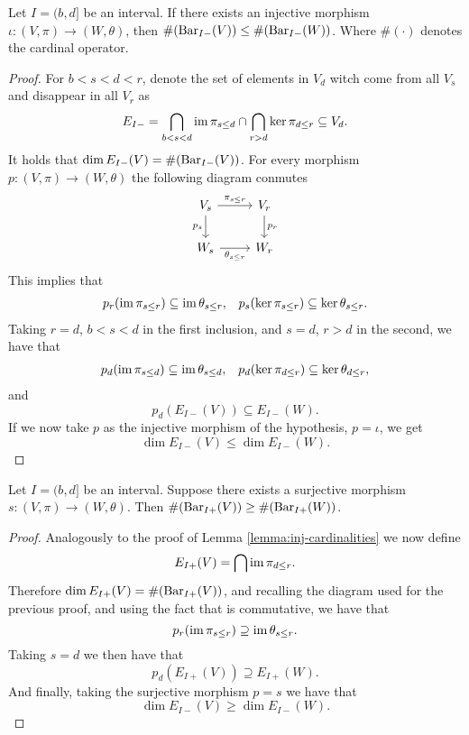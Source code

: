 \begin{lemma} \label{lemma:inj-cardinalities}
    Let $ I = (b, d] $ be an interval. If there exists an injective morphism $\iota \colon (V, \pi) \to (W, \theta) $, then $\#(\operatorname{Bar}_{I-}(V)) \leq \#(\operatorname{Bar}_{I-}(W)) $. Where $ \#(\cdot) $ denotes the cardinal operator.
\end{lemma}
\begin{proof}
    For $ b < s < d < r $, denote the set of elements in $ V_d $ witch come from all $ V_s $ and disappear in all $ V_r $ as
    $$
        E_{I-} = \bigcap_{b < s < d} \operatorname{im} \pi_{s\leq d} \cap \bigcap_{r> d} \ker \pi_{d \leq r} \subseteq V_d.
    $$
    It holds that $ \dim E_{I-}(V) = \#(\operatorname{Bar}_{I-}(V)) $. For every morphism $ p\colon (V, \pi) \to (W, \theta) $ the following diagram conmutes
    $$
    \begin{tikzcd}
        V_s \arrow[r, "\pi_{s \leq r}"] \arrow[d, "p_s"'] & V_r \arrow[d, "p_r"] \\
        W_s \arrow[r, "\theta_{s \leq r}"']               & W_r
    \end{tikzcd}
    $$
    This implies that
    \begin{align}
        p_r(\operatorname{im} \pi_{s \leq r}) \subseteq \operatorname{im} \theta_{s \leq r}, & & p_s(\ker \pi_{s \leq r}) \subseteq \ker \theta_{s \leq r}.
    \end{align}
    Taking $ r = d $, $ b < s < d $ in the first inclusion, and $ s = d $, $ r > d $ in the second, we have that
    \begin{align}
        p_d(\operatorname{im} \pi_{s \leq d}) \subseteq \operatorname{im} \theta_{s \leq d}, & & p_d(\ker \pi_{d \leq r}) \subseteq \ker \theta_{d \leq r},
    \end{align}
    and 
    $$
        p_d(E_{I-}(V)) \subseteq E_{I-}(W).
    $$
    If we now take $ p $ as the injective morphism of the hypothesis, $ p = \iota $, we get
    $$
        \dim E_{I-}(V) \leq \dim E_{I-}(W).
    $$
\end{proof}
 
\begin{lemma} \label{lemma:sur-cardinalities}
    Let $ I = (b, d] $ be an interval. Suppose there exists a surjective morphism $s\colon (V, \pi) \to (W, \theta) $. Then $\#(\operatorname{Bar}_{I+}(V)) \geq \#(\operatorname{Bar}_{I+}(W)) $.
\end{lemma}
\begin{proof}
    Analogously to the proof of Lemma \ref{lemma:inj-cardinalities} we now define
    $$
        E_{I+}(V) = \bigcap \operatorname{im} \pi_{d \leq r}.
    $$
    Therefore $ \dim E_{I+}(V) = \#(\operatorname{Bar}_{I+}(V)) $, and recalling the diagram used for the previous proof, and using the fact that is commutative, we have that
    $$
        p_r(\operatorname{im} \pi_{s \leq r}) \supseteq \operatorname{im} \theta_{s \leq r}.
    $$
    Taking $ s = d $ we then have that
    $$
        p_d(E_{I+}(V)) \supseteq E_{I+}(W).
    $$
    And finally, taking the surjective morphism $ p = s $ we have that
    $$
        \dim E_{I-}(V) \geq \dim E_{I-}(W).
    $$
\end{proof}

